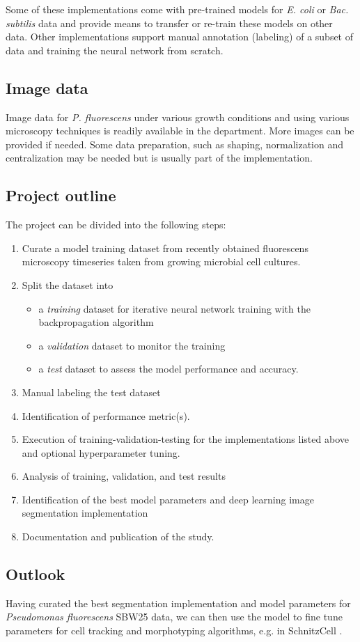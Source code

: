 \documentclass[a4paper]{article}
\begin{document}
Some of these implementations come with pre-trained models for \textit{E. coli} or \textit{Bac. subtilis} data and provide means to
transfer or re-train these models on other data. Other implementations support manual annotation (labeling) of a subset of data and training the neural network from scratch.

\subsection{Image data}
Image data for \textit{P. fluorescens} under various growth conditions and using various microscopy techniques is readily
available in the department. More images can be provided if needed. Some data preparation,
such as shaping, normalization and centralization may be needed but is usually part of the implementation.

\subsection{Project outline}

The project can be divided into the following steps:
\begin{enumerate}
    \item Curate a model training dataset from recently
          obtained fluorescens microscopy timeseries taken from growing microbial cell cultures.
    \item Split the dataset into
        \begin{itemize}
            \item a \emph{training} dataset for iterative neural network training with the backpropagation
                algorithm 
            \item a \emph{validation} dataset to monitor the training
            \item a \emph{test} dataset to assess the model performance and accuracy.
        \end{itemize}
    \item Manual labeling the test dataset
    \item Identification of performance metric(s).
    \item Execution of training-validation-testing for the implementations listed above 
        and optional hyperparameter tuning.
    \item Analysis of training, validation, and test results
    \item Identification of the best model parameters and deep learning image segmentation implementation
    \item Documentation and publication of the study. 
\end{enumerate}

\subsection{Outlook}
Having curated the best segmentation implementation and model parameters for \textit{Pseudomonas fluorescens} SBW25 data, we can
then use the model to fine tune parameters for cell tracking and morphotyping algorithms, e.g. in SchnitzCell \cite{Young2012}. 

\printbibliography
\end{document}
